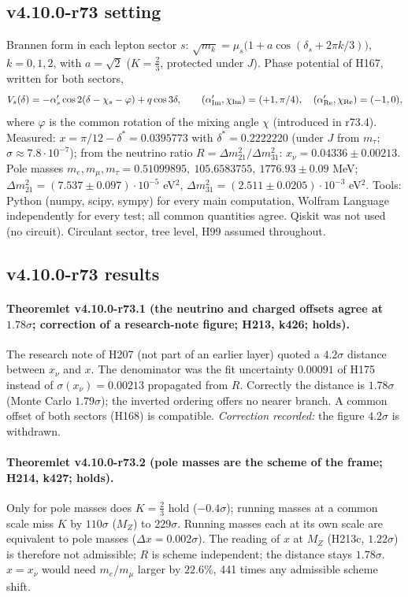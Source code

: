 \subsection*{v4.10.0-r73 setting}
\label{subsec:v4100-r73-setting}

Brannen form in each lepton sector \(s\): \(\sqrt{m_k}=\mu_s\bigl(1+a\cos(\delta_s+2\pi k/3)\bigr)\), \(k=0,1,2\), with \(a=\sqrt2\) (\(K=\tfrac23\),
protected under \(J\)).  Phase potential of H167, written for both sectors,
\[
V_s(\delta)=-\alpha'_s\cos2(\delta-\chi_s-\varphi)+q\cos3\delta ,
\qquad
(\alpha'_{\rm Im},\chi_{\rm Im})=(+1,\pi/4),\quad (\alpha'_{\rm Re},\chi_{\rm Re})=(-1,0),
\]
where \(\varphi\) is the common rotation of the mixing angle \(\chi\) (introduced in r73.4).  Measured: \(x=\pi/12-\delta^*=0.0395773\) with
\(\delta^*=0.2222220\) (under \(J\) from \(m_\tau\); \(\sigma\approx7.8\cdot10^{-7}\)); from the neutrino ratio \(R=\Delta m^2_{21}/\Delta m^2_{31}\):
\(x_\nu=0.04336\pm0.00213\).  Pole masses \(m_e,m_\mu,m_\tau=0.51099895,\ 105.6583755,\ 1776.93\pm0.09\) MeV;
\(\Delta m^2_{21}=(7.537\pm0.097)\cdot10^{-5}\) eV\(^2\), \(\Delta m^2_{31}=(2.511\pm0.0205)\cdot10^{-3}\) eV\(^2\).  Tools: Python (numpy, scipy, sympy) for
every main computation, Wolfram Language independently for every test; all common quantities agree.  Qiskit was not used (no circuit).
Circulant sector, tree level, H99 assumed throughout.

\subsection*{v4.10.0-r73 results}
\label{subsec:v4100-r73-results}

\paragraph{Theoremlet v4.10.0-r73.1 (the neutrino and charged offsets agree at \(1.78\sigma\); correction of a research-note figure; H213, k426; holds).}
The research note of H207 (not part of an earlier layer) quoted a \(4.2\sigma\) distance between \(x_\nu\) and \(x\).  The denominator was the fit
uncertainty \(0.00091\) of H175 instead of \(\sigma(x_\nu)=0.00213\) propagated from \(R\).  Correctly the distance is \(1.78\sigma\) (Monte Carlo
\(1.79\sigma\)); the inverted ordering offers no nearer branch.  A common offset of both sectors (H168) is compatible.  \emph{Correction recorded:}
the figure \(4.2\sigma\) is withdrawn.

\paragraph{Theoremlet v4.10.0-r73.2 (pole masses are the scheme of the frame; H214, k427; holds).}
Only for pole masses does \(K=\tfrac23\) hold (\(-0.4\sigma\)); running masses at a common scale miss \(K\) by \(110\sigma\) (\(M_Z\)) to \(229\sigma\).
Running masses each at its own scale are equivalent to pole masses (\(\Delta x=0.002\sigma\)).  The reading of \(x\) at \(M_Z\) (H213c, \(1.22\sigma\))
is therefore not admissible; \(R\) is scheme independent; the distance stays \(1.78\sigma\).  \(x=x_\nu\) would need \(m_e/m_\mu\) larger by
\(22.6\%\), 441 times any admissible scheme shift.

